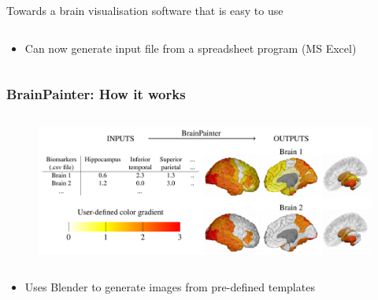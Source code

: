 \documentclass[10pt,xcolor=table,aspectratio=169]{beamer}
\begin{document}
\begin{frame}{Towards a brain visualisation software that is easy to use}
\begin{columns}[t]
\begin{column}[t]{0.5\textwidth}
\begin{itemize}
  \item Can now generate input file from a spreadsheet program (MS Excel)
  
  
  \end{itemize}
     
     
     
  \end{column}

 
 \end{columns}

 




 
 
\end{frame}



\begin{frame}
 \frametitle{BrainPainter: How it works}

  
\begin{figure}
\centering
\includegraphics[height=5cm]{images/diagram.png}
\end{figure}
 
\begin{itemize}
 \item Uses Blender to generate images from pre-defined templates
\end{itemize}


 
\end{frame} 
\end{document}
